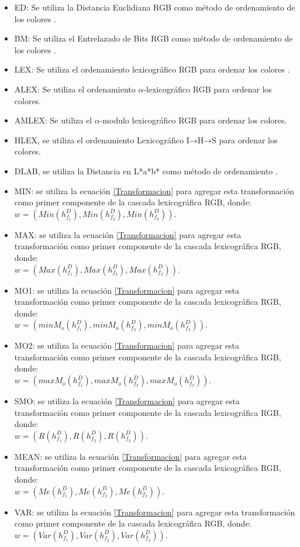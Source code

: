 \begin{itemize}
	\item ED: Se utiliza la Distancia Euclidiana  RGB como m\'etodo de ordenamiento de los colores \cite{ortiz2002procesamiento}.
	\item BM: Se utiliza el Entrelazado de Bits RGB como m\'etodo de ordenamiento de los colores \cite{chanussot1997bit}.
	\item LEX: Se utiliza el ordenamiento lexicogr\'afico RGB para ordenar los colores .
	\item ALEX: Se utiliza el ordenamiento $\alpha$-lexicogr\'afico RGB \cite{zamora2001comparative} para ordenar los colores.
	\item AMLEX: Se utiliza el  $\alpha$-modulo lexicogr\'afico RGB \cite{angulo2003morphological} para ordenar los colores.
	\item HLEX, se utiliza el ordenamiento Lexicográfico I→H→S para ordenar los colores.
	\item DLAB, se utiliza la Distancia en L*a*b* como m\'etodo de ordenamiento \cite{ortiz2002procesamiento}.
	\item MIN: se utiliza la ecuaci\'on \ref{Transformacion} para agregar esta transformaci\'on como primer componente de la cascada lexicogr\'afica RGB, donde:\\ 
$w = (Min(h_{f_1}^D), Min(h_{f_2}^D),Min(h_{f_3}^D))$.
	\item MAX: se utiliza la ecuaci\'on \ref{Transformacion} para agregar esta transformaci\'on como primer componente de la cascada lexicogr\'afica RGB, donde:\\ 
$w = (Max(h_{f_1}^D), Max(h_{f_2}^D),Max(h_{f_3}^D))$.
	\item MO1: se utiliza la ecuaci\'on \ref{Transformacion} para agregar esta transformaci\'on como primer componente de la cascada lexicogr\'afica RGB, donde:\\ 
$w = (minM_o(h_{f_1}^D), minM_o(h_{f_2}^D), minM_o(h_{f_3}^D))$.
	\item MO2: se utiliza la ecuaci\'on \ref{Transformacion} para agregar esta transformaci\'on como primer componente de la cascada lexicogr\'afica RGB, donde:\\ 
$w = (maxM_o(h_{f_1}^D), maxM_o(h_{f_2}^D), maxM_o(h_{f_3}^D))$.
	\item SMO: se utiliza la ecuaci\'on \ref{Transformacion} para agregar esta transformaci\'on como primer componente de la cascada lexicogr\'afica RGB, donde:\\ 
$w = (R(h_{f_1}^D), R(h_{f_2}^D), R(h_{f_3}^D))$.
	\item MEAN: se utiliza la ecuaci\'on \ref{Transformacion} para agregar esta transformaci\'on como primer componente de la cascada lexicogr\'afica RGB, donde:\\ 
$w = (Me(h_{f_1}^D), Me(h_{f_2}^D), Me(h_{f_3}^D))$.
	\item VAR: se utiliza la ecuaci\'on \ref{Transformacion} para agregar esta transformaci\'on como primer componente de la cascada lexicogr\'afica RGB, donde:\\ 
$w = (Var(h_{f_1}^D), Var(h_{f_2}^D), Var(h_{f_3}^D))$.
\end{itemize}

